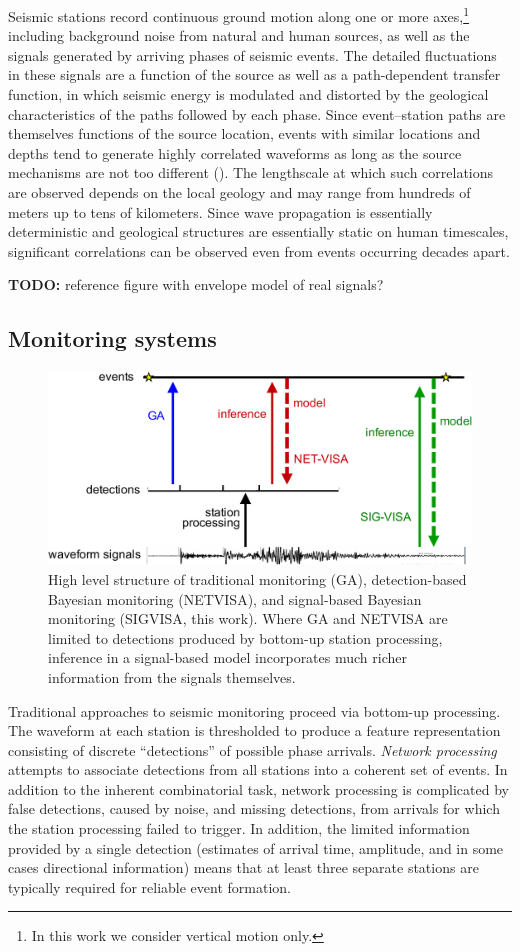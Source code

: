 \documentclass[twoside]{article} \usepackage{aistats2017}
\newcommand{\todo}[1]{{\color{red} \textbf{TODO:} {#1}}}
\begin{document}
Seismic stations record continuous ground motion along one or more
axes,\footnote{In this work we consider vertical motion only.} including background noise from natural and human sources, as well as the
signals generated by arriving phases of seismic events. The detailed
fluctuations in these signals are a function of the source  as well as a path-dependent transfer function,
in which seismic energy is modulated and distorted by the geological
characteristics of the paths followed by each phase. Since
event--station paths are themselves functions of the source location,
events with similar locations and depths tend to generate
highly correlated waveforms as long as the source mechanisms are not
too different (). The lengthscale at which such
correlations are observed depends on the local geology and may range
from hundreds of meters up to tens of kilometers. Since wave propagation is
essentially deterministic and geological structures are essentially static
on human timescales, significant correlations can be observed even
from events occurring decades apart. 

\todo{reference figure with envelope model of real signals?}

\subsection{Monitoring systems}

\begin{figure}
\centering
\includegraphics[width=.45\textwidth]{netvisa_sigvisa-crop}
\caption{High level structure of traditional monitoring (GA), detection-based Bayesian monitoring (NETVISA), and signal-based Bayesian monitoring (SIGVISA, this work). Where GA and NETVISA are limited to detections produced by bottom-up station processing, inference in a signal-based model incorporates much richer information from the signals themselves.}
\label{fig:monitoring_comparison}
\end{figure}

Traditional approaches to seismic monitoring proceed via bottom-up
processing. The waveform at each station is thresholded to
produce a feature representation consisting of discrete ``detections'' of possible phase
arrivals. {\em
  Network processing} attempts to associate detections from
all stations into a coherent set of events. In addition to the
inherent combinatorial task, network processing is complicated by
false detections, caused by noise, and missing detections, from
arrivals for which the station processing failed to trigger.
In addition, the limited information provided by a single detection
(estimates of arrival time, amplitude, and in some cases
directional information) means that at least three
separate stations are typically required for reliable event
formation. 
\end{document}
